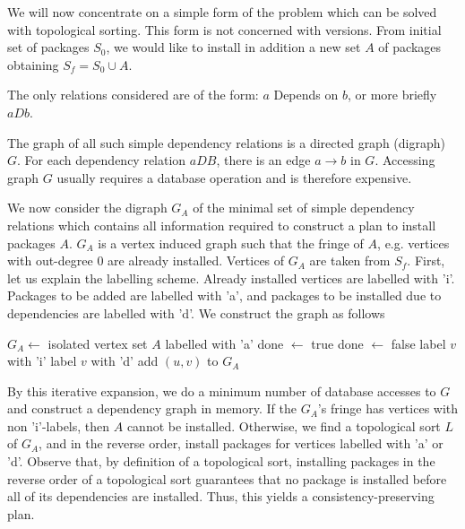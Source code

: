 \documentclass[a4paper,11pt]{article}
\begin{document}
We will now concentrate on a simple form of the problem which can
be solved with topological sorting. This form is not concerned with
versions. From initial set of packages $S_0$, we would like to
install in addition a new set $A$ of packages obtaining $S_f = S_0 \cup
A$.

The only relations considered are of the form: $a$ Depends on $b$, or more
briefly $aDb$.

The graph of all such simple dependency relations is a directed graph
(digraph) $G$. For each dependency relation $aDB$, there is an edge $a
\to b$ in $G$. Accessing graph $G$ usually requires a database operation and
is therefore expensive.

We now consider the digraph $G_A$ of the minimal set of simple
dependency relations which contains all information required to
construct a plan to install packages $A$. $G_A$ is a vertex induced graph
such that the fringe of $A$, e.g. vertices with out-degree $0$ are
already installed. Vertices of $G_A$ are taken from $S_f$. First, let us
explain the labelling scheme. Already installed vertices are labelled
with 'i'. Packages to be added are labelled with 'a', and packages to
be installed due to dependencies are labelled with 'd'. We
construct the graph as follows
\begin{algorithm}
  \label{alg:cons-graph}
  \begin{algorithmic}[1]
\STATE $G_A \gets$ isolated vertex set $A$ labelled with 'a'
\REPEAT
  \STATE done $\gets$ true
        \STATE done $\gets$ false
          \STATE label $v$ with 'i'
        \ELSE
          \STATE label $v$ with 'd'
        \ENDIF
        \STATE add $(u,v)$ to $G_A$
       \ENDIF
     \ENDFOR
  \ENDFOR
{}
\end{algorithmic}
\end{algorithm}

By this iterative expansion, we do a minimum number of database
accesses to $G$ and construct a dependency graph in memory. If the
$G_A$'s fringe has vertices with non 'i'-labels, then $A$ cannot be
installed. Otherwise, we find a topological sort $L$ of $G_A$, and in
the reverse order, install packages for vertices labelled with
'a' or 'd'. Observe that, by definition of a topological sort,
installing packages in the reverse order of a topological sort
guarantees that no package is installed before all of its dependencies
are installed. Thus, this yields a consistency-preserving plan.
\end{document}
